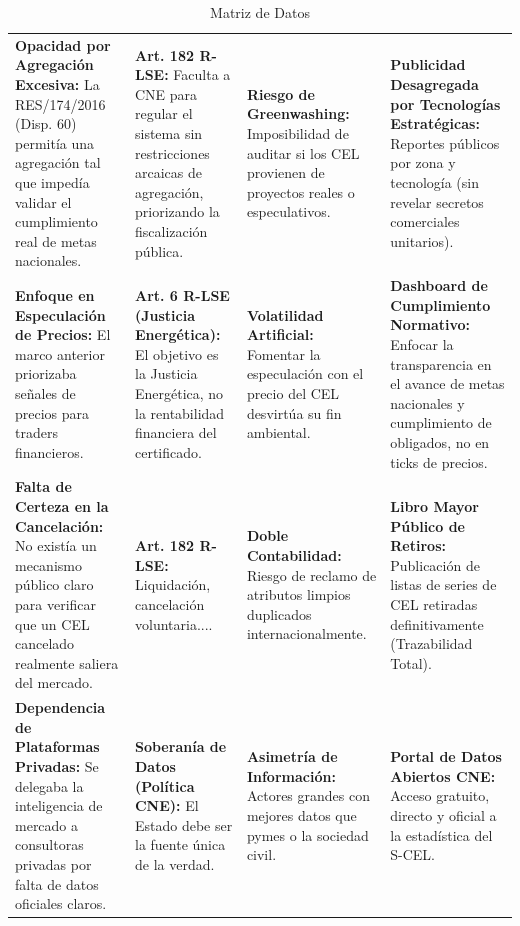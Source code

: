 \documentclass{cel}
\begin{document}
\vspace{0.3cm}
\begin{tabladoradoLargo}
\renewcommand{\tabularxcolumn}[1]{p{#1}}
\begin{xltabular}{\textwidth}{|X|X|X|X|}
\caption{Matriz de Datos} \\
\toprule
{}  &  &  &  \\
\midrule
\endhead
\textbf{Opacidad por Agregación Excesiva:} La RES/174/2016 (Disp. 60) permitía una agregación tal que impedía validar el cumplimiento real de metas nacionales. & \textbf{Art. 182 R-LSE:} Faculta a CNE para regular el sistema sin restricciones arcaicas de agregación, priorizando la fiscalización pública. & \textbf{Riesgo de \textquotedbl{}Greenwashing\textquotedbl{}:} Imposibilidad de auditar si los CEL provienen de proyectos reales o especulativos. & \textbf{Publicidad Desagregada por Tecnologías Estratégicas:} Reportes públicos por zona y tecnología (sin revelar secretos comerciales unitarios). \\ \hline
\textbf{Enfoque en Especulación de Precios:} El marco anterior priorizaba \textquotedbl{}señales de precios\textquotedbl{} para traders financieros. & \textbf{Art. 6 R-LSE (Justicia Energética):} El objetivo es la \textquotedbl{}Justicia Energética\textquotedbl{}, no la rentabilidad financiera del certificado. & \textbf{Volatilidad Artificial:} Fomentar la especulación con el precio del CEL desvirtúa su fin ambiental. & \textbf{Dashboard de Cumplimiento Normativo:} Enfocar la transparencia en el avance de metas nacionales y cumplimiento de obligados, no en ticks de precios. \\ \hline
\textbf{Falta de Certeza en la Cancelación:} No existía un mecanismo público claro para verificar que un CEL \textquotedbl{}cancelado\textquotedbl{} realmente saliera del mercado. & \textbf{Art. 182 R-LSE:} \textquotedbl{}Liquidación, cancelación voluntaria...\textquotedbl{}. & \textbf{Doble Contabilidad:} Riesgo de reclamo de atributos limpios duplicados internacionalmente. & \textbf{Libro Mayor Público de Retiros:} Publicación de listas de series de CEL retiradas definitivamente (Trazabilidad Total). \\ \hline
\textbf{Dependencia de Plataformas Privadas:} Se delegaba la inteligencia de mercado a consultoras privadas por falta de datos oficiales claros. & \textbf{Soberanía de Datos (Política CNE):} El Estado debe ser la fuente única de la verdad. & \textbf{Asimetría de Información:} Actores grandes con mejores datos que pymes o la sociedad civil. & \textbf{Portal de Datos Abiertos CNE:} Acceso gratuito, directo y oficial a la estadística del S-CEL. \\ \hline
\bottomrule
\end{xltabular}
\end{tabladoradoLargo}
\end{document}
